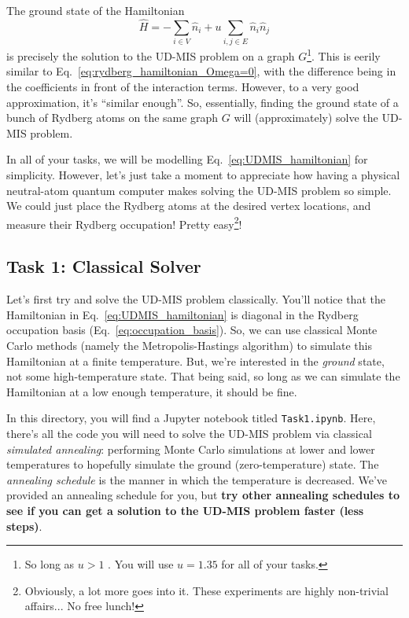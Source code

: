 \documentclass[12pt]{article}
\begin{document}
The ground state of the Hamiltonian
\begin{equation} \label{eq:UDMIS_hamiltonian}
	\hat{H} = -\sum_{i \in V} \hat{n}_i + u \sum_{i,j \in E} \hat{n}_i \hat{n}_j
\end{equation}
is precisely the solution to the UD-MIS problem on a graph $G$\footnote{So long as $u > 1$ \cite{serret_solving_2020}. You will use $u = 1.35$ for all of your tasks.}.
This is eerily similar to Eq.~\ref{eq:rydberg_hamiltonian_Omega=0}, with the difference being in the coefficients in front of the interaction terms.
However, to a very good approximation, it's ``similar enough''.
So, essentially, finding the ground state of a bunch of Rydberg atoms on the same graph $G$ will (approximately) solve the UD-MIS problem.

In all of your tasks, we will be modelling Eq.~\ref{eq:UDMIS_hamiltonian} for simplicity.
However, let's just take a moment to appreciate how having a physical neutral-atom quantum computer makes solving the UD-MIS problem so simple.
We could just place the Rydberg atoms at the desired vertex locations, and measure their Rydberg occupation! Pretty easy\footnote{Obviously, a lot more goes into it. These experiments are highly non-trivial affairs... No free lunch!}!

\subsection*{Task 1: Classical Solver}

Let's first try and solve the UD-MIS problem classically.
You'll notice that the Hamiltonian in Eq.~\ref{eq:UDMIS_hamiltonian} is diagonal in the Rydberg occupation basis (Eq.~\ref{eq:occupation_basis}).
So, we can use classical Monte Carlo methods (namely the Metropolis-Hastings algorithm) to simulate this Hamiltonian at a finite temperature.
But, we're interested in the {\it ground} state, not some high-temperature state.
That being said, so long as we can simulate the Hamiltonian at a low enough temperature, it should be fine.

In this directory, you will find a Jupyter notebook titled \texttt{Task1.ipynb}.
Here, there's all the code you will need to solve the UD-MIS problem via classical {\it simulated annealing}: performing Monte Carlo simulations at lower and lower temperatures to hopefully simulate the ground (zero-temperature) state.
The {\it annealing schedule} is the manner in which the temperature is decreased.
We've provided an annealing schedule for you, but {\bf try other annealing schedules to see if you can get a solution to the UD-MIS problem faster (less steps)}.
\end{document}
